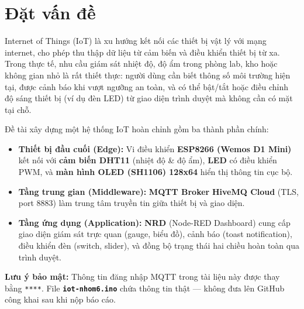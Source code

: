 \documentclass[13pt,a4paper]{article}
\newcommand{\code}[1]{\texttt{#1}}
\newcommand{\file}[1]{\textbf{\texttt{#1}}}
\begin{document}
\newpage
\thispagestyle{fancy}
\section{Đặt vấn đề}
\label{sec:datvandde}

Internet of Things (IoT) là xu hướng kết nối các thiết bị vật lý với mạng internet, cho phép thu thập dữ liệu từ cảm biến và điều khiển thiết bị từ xa. Trong thực tế, nhu cầu giám sát nhiệt độ, độ ẩm trong phòng lab, kho hoặc không gian nhỏ là rất thiết thực: người dùng cần biết thông số môi trường hiện tại, được cảnh báo khi vượt ngưỡng an toàn, và có thể bật/tắt hoặc điều chỉnh độ sáng thiết bị (ví dụ đèn LED) từ giao diện trình duyệt mà không cần có mặt tại chỗ.

Đề tài xây dựng một hệ thống IoT hoàn chỉnh gồm ba thành phần chính:

\begin{itemize}
    \item \textbf{Thiết bị đầu cuối (Edge):} Vi điều khiển \textbf{ESP8266 (Wemos D1 Mini)} kết nối với \textbf{cảm biến DHT11} (nhiệt độ \& độ ẩm), \textbf{LED} có điều khiển PWM, và \textbf{màn hình OLED (SH1106) 128x64} hiển thị thông tin cục bộ.
    \item \textbf{Tầng trung gian (Middleware):} \textbf{MQTT Broker} \textbf{HiveMQ Cloud} (TLS, port 8883) làm trung tâm truyền tin giữa thiết bị và giao diện.
    \item \textbf{Tầng ứng dụng (Application):} \textbf{NRD} (Node-RED Dashboard) cung cấp giao diện giám sát trực quan (gauge, biểu đồ), cảnh báo (toast notification), điều khiển đèn (switch, slider), và đồng bộ trạng thái hai chiều hoàn toàn qua trình duyệt.
\end{itemize}

\begin{mdframed}[backgroundcolor=yellow!20, linecolor=yellow!60]
    \textbf{Lưu ý bảo mật:} Thông tin đăng nhập MQTT trong tài liệu này được thay bằng \code{****}. File \file{iot-nhom6.ino} chứa thông tin thật --- không đưa lên GitHub công khai sau khi nộp báo cáo.
\end{mdframed}

\end{document}
